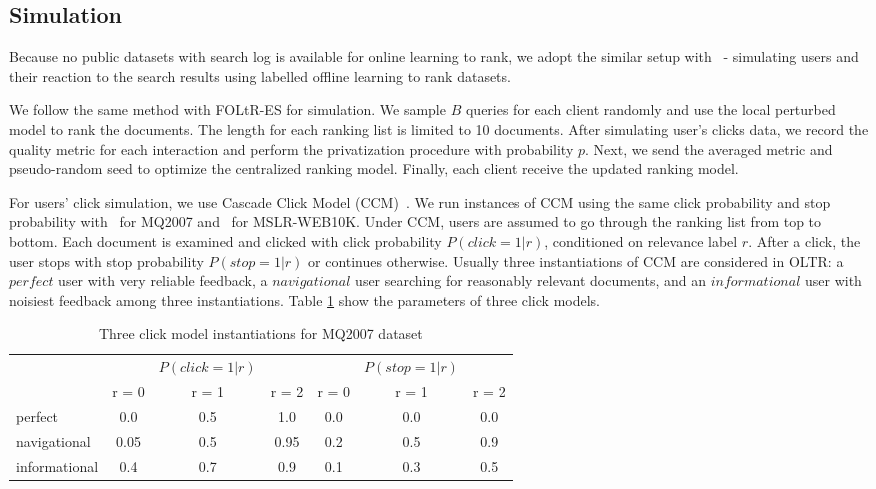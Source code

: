 \subsection{Simulation}

Because no public datasets with search log is available for online learning to rank, we adopt the similar setup with~\cite{DBLP:conf/wsdm/SchuthOWR16, DBLP:conf/wsdm/HofmannSWR13} - simulating users and their reaction to the search results using labelled offline learning to rank datasets.

We follow the same method with FOLtR-ES for simulation. We sample $B$ queries for each client randomly and use the local perturbed model to rank the documents. The length for each ranking list is limited to 10 documents. After simulating user's clicks data, we record the quality metric for each interaction and perform the privatization procedure with probability $p$. Next, we send the averaged metric and pseudo-random seed to optimize the centralized ranking model. Finally, each client receive the updated ranking model. 

For users' click simulation, we use Cascade Click Model (CCM)~\cite{DBLP:conf/wsdm/GuoLW09}. We run instances of CCM using the same click probability and stop probability with~\cite{kharitonov2019federated} for MQ2007 and~\cite{oosterhuis2016probabilistic} for MSLR-WEB10K. Under CCM, users are assumed to go through the ranking list from top to bottom. Each document is examined and clicked with click probability $P(click = 1 | r)$, conditioned on relevance label $r$. After a click, the user stops with stop probability $P(stop = 1 | r)$ or continues otherwise. Usually three instantiations of CCM are considered in OLTR: a $perfect$ user with very reliable feedback, a $navigational$ user searching for reasonably relevant documents, and an $informational$ user with noisiest feedback among three instantiations.  Table \ref{table:1:cm-mq2007} show the parameters of three click models.

\begin{table}
	\caption{Three click model instantiations for MQ2007 dataset}
	\label{table:1:cm-mq2007}
	\centering
	\begin{tabular}{l c c c c c c}
		\hline
		&&$P(click = 1 | r)$ &&& $P(stop = 1 | r)$  & \\
		& r = 0&  r = 1  & r = 2 & r = 0&  r = 1  & r = 2\\
		\midrule
		perfect  &   0.0  &    0.5  &    1.0 & 0.0 & 0.0 & 0.0   \\
		navigational  &  0.05  &   0.5  &    0.95  & 0.2 & 0.5 & 0.9  \\
		informational  &   0.4 &   0.7  &    0.9 & 0.1 & 0.3 & 0.5 \\
		\hline
	\end{tabular}
\end{table}

